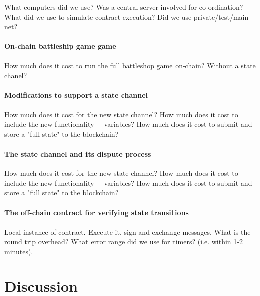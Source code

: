 \documentclass{llncs}
\begin{document}
What computers did we use? Was a central server involved for co-ordination? What did we use to simulate contract execution? Did we use private/test/main net? 

\paragraph{On-chain battleship game game} 

How much does it cost to run the full battleshop game on-chain? Without a state chanel? 

\paragraph{Modifications to support a state channel} 

How much does it cost for the new state channel? How much does it cost to include the new functionality + variables? How much does it cost to submit and store a "full state" to the blockchain?  

\paragraph{The state channel and its dispute process } 

How much does it cost for the new state channel? How much does it cost to include the new functionality + variables? How much does it cost to submit and store a "full state" to the blockchain?  

\paragraph{The off-chain contract for verifying state transitions} 

Local instance of contract. Execute it, sign and exchange messages. What is the round trip overhead? What error range did we use for timers? (i.e. within 1-2 minutes). 

\section{Discussion} 

\end{document}
